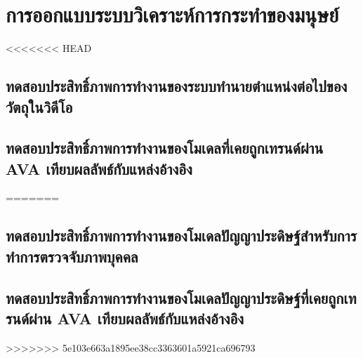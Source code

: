 \section{การออกแบบระบบวิเคราะห์การกระทำของมนุษย์}
<<<<<<< HEAD
\subsection{ทดสอบประสิทธิ์ภาพการทำงานของระบบทำนายตำแหน่งต่อไปของวัตถุในวิดีโอ}

\clearpage

\subsection{ทดสอบประสิทธิ์ภาพการทำงานของโมเดลที่เคยถูกเทรนด์ผ่าน AVA เทียบผลลัพธ์กับแหล่งอ้างอิง}

=======
\subsection{ทดสอบประสิทธิ์ภาพการทำงานของโมเดลปัญญาประดิษฐ์สำหรับการทำการตรวจจับภาพบุคคล}



\subsection{ทดสอบประสิทธิ์ภาพการทำงานของโมเดลปัญญาประดิษฐ์ที่เคยถูกเทรนด์ผ่าน AVA เทียบผลลัพธ์กับแหล่งอ้างอิง}

>>>>>>> 5e103e663a1895ee38cc3363601a5921ca696793
